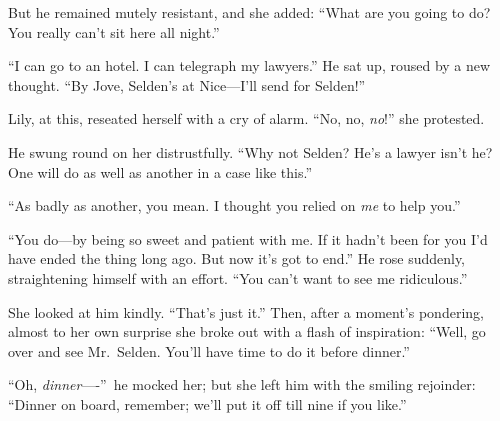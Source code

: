 \documentclass[12pt,a4paper]{book}
\begin{document}
But he remained mutely resistant, and she added: ``What are you
going to do? You really can't sit here all night.''





``I can go to an hotel. I can telegraph my lawyers.'' He sat up,
roused by a new thought. ``By Jove, Selden's at Nice---I'll send
for Selden!''





Lily, at this, reseated herself with a cry of alarm. ``No, no, \textit{no}!''
she protested.





He swung round on her distrustfully. ``Why not Selden? He's a
lawyer isn't he? One will do as well as another in a case like
this.''





``As badly as another, you mean. I thought you relied on \textit{me} to
help you.''





``You do---by being so sweet and patient with me. If it hadn't been
for you I'd have ended the thing long ago. But now it's got to
end.'' He rose suddenly, straightening himself with an effort. 
``You can't want to see me ridiculous.''





She looked at him kindly. ``That's just it.'' Then, after a
moment's pondering, almost to her own surprise she broke out with
a flash of inspiration: ``Well, go over and see Mr.\ Selden. You'll
have time to do it before dinner.''





``Oh, \textit{dinner}----''\ he mocked her; but she left him with the smiling
rejoinder: ``Dinner on board, remember; we'll put it off till nine
if you like.''
\end{document}
